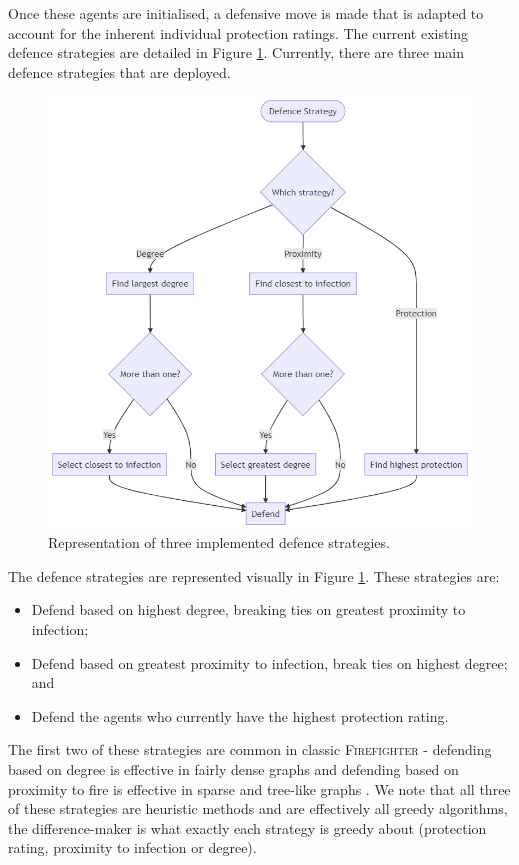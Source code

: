 \documentclass[../report.tex]{subfiles}
\begin{document}
Once these agents are initialised, a defensive move is made that is adapted to account for the inherent individual protection ratings. The current existing defence strategies are detailed in Figure \ref{fig:defence}. Currently, there are three main defence strategies that are deployed.

\begin{figure}[!ht]
  \centering
  \includegraphics[width=0.75\linewidth]{assets/defence}
  \caption{Representation of three implemented defence strategies.}
  \label{fig:defence}
\end{figure}

The defence strategies are represented visually in Figure \ref{fig:defence}. These strategies are:
\begin{itemize}
	\item Defend based on highest degree, breaking ties on greatest proximity to infection;
	\item Defend based on greatest proximity to infection, break ties on highest degree; and
	\item Defend the agents who currently have the highest protection rating.
\end{itemize}
The first two of these strategies are common in classic {\scshape Firefighter} - defending based on degree is effective in fairly dense graphs and defending based on proximity to fire is effective in sparse and tree-like graphs \cite{finbow_2009}. We note that all three of these strategies are heuristic methods and are effectively all greedy algorithms, the difference-maker is what exactly each strategy is greedy about (protection rating, proximity to infection or degree).
\end{document}
